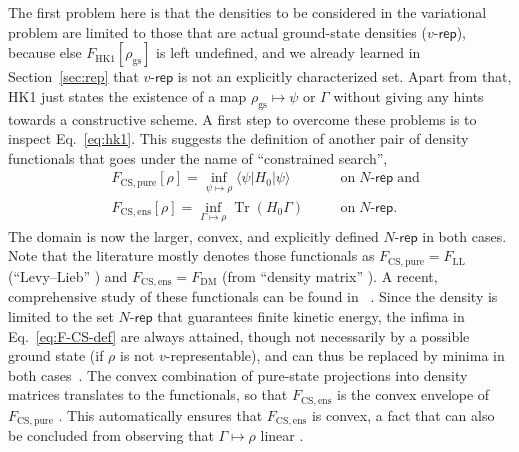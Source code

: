 \documentclass[journal=apcach,manuscript=article,layout=twocolumn]{achemso}
\newcommand{\rhogs}{{\rho_\mathrm{gs}}}
\newcommand{\FHK}{F_\mathrm{HK1}}
\newcommand{\FLL}{F_\mathrm{LL}}
\newcommand{\FDM}{F_\mathrm{DM}}
\newcommand{\FCSpure}{F_\mathrm{CS,pure}}
\newcommand{\FCSens}{F_\mathrm{CS,ens}}
\newcommand{\vrep}{\ensuremath{v\text{-}\mathsf{rep}}}
\newcommand{\Nrep}{\ensuremath{N\text{-}\mathsf{rep}}}
\DeclareMathOperator{\trace}{Tr}
\begin{document}
The first problem here is that the densities to be considered in the variational problem are limited to those that are actual ground-state densities (\vrep), because else $\FHK[\rhogs]$ is left undefined, and we already learned in Section~\ref{sec:rep} that \vrep{} is not an explicitly characterized set.
Apart from that, HK1 just states the existence of a map $\rhogs \mapsto \psi$ or $\Gamma$ without giving any hints towards a constructive scheme. A first step to overcome these problems is to inspect Eq.~\eqref{eq:hk1}. 
This suggests the definition of another pair of density functionals that goes under the name of ``constrained search'',
\begin{subequations}\label{eq:F-CS-def}
\begin{alignat}{3}
    \label{eq:F-CSpure-def}
    &\FCSpure[\rho] = \inf_{\psi \mapsto \rho} \langle \psi| H_0 | \psi \rangle   &&\quad\text{on}\; \Nrep \; \text{and}\\
    \label{eq:F-CSens-def}
    &\FCSens[\rho] = \inf_{\Gamma \mapsto \rho} \trace (H_0\Gamma) &&\quad\text{on}\; \Nrep.
\end{alignat}
\end{subequations}
The domain is now the larger, convex, and explicitly defined $\Nrep$ in both cases. Note that the literature mostly denotes those functionals as $\FCSpure=\FLL$ (``Levy--Lieb'' \cite{Levy79,Lieb1983}) and $\FCSens=\FDM$ (from ``density matrix'' \cite{Lieb1983}). A recent, comprehensive study of these functionals can be found in \citeauthor{lewin2019universal}~\cite{lewin2019universal}.
Since the density is limited to the set $\Nrep$ that guarantees finite kinetic energy, the infima in Eq.~\eqref{eq:F-CS-def} are always attained, though not necessarily by a possible ground state (if $\rho$ is not $v$-representable), and can thus be replaced by minima in both cases~\cite[Theorem~3.3]{Lieb1983}. 
The convex combination of pure-state projections into density matrices translates to the functionals, so that $\FCSens$ is the convex envelope of $\FCSpure$ \cite[Proposition~18, the article treats DFT on a lattice but the statement and the proof of proposition remains exactly the same in the continuum case.]{penz-DFT-graphs}. This automatically ensures that $\FCSens$ is convex, a fact that can also be concluded from observing that $\Gamma \mapsto \rho$ linear \cite[Section~4.B]{Lieb1983}.
\end{document}
